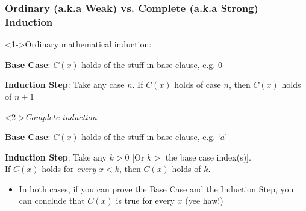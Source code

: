  \begin{frame}
\frametitle{Ordinary (a.k.a Weak) vs. Complete (a.k.a Strong) Induction}


%

 \begin{block}<1->{Ordinary mathematical induction:}

{\bf{Base Case}}: $C(x)$ holds of the stuff in base clause, e.g. $0$

{\bf{Induction Step}}: Take any case $n$. If $C(x)$ holds of case $n$, then  $C(x)$ holds of $n+1$
  \end{block}

\begin{block}<2->{\emph{Complete induction}:}

{\bf{Base Case}}: $C(x)$ holds of the stuff in base clause, e.g. `$a$' 


{\bf{Induction Step}}: Take any $k >0$ [Or $k >$ the base case index(s)]. \\  \phantom{Induction Step} If $C(x)$ holds for \emph{every} $x < k$, then $C(x)$ holds of $k$.
  \end{block}

\begin{itemize}[<+->]
\item<3-> In both cases, if you can prove the Base Case and the Induction Step, you can conclude that $C(x)$ is true for every $x$ (yee haw!)
\end{itemize} 
\end{frame}


